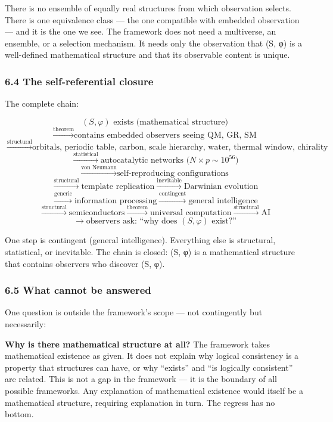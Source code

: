 \documentclass[
]{article}
\begin{document}
There is no ensemble of equally real structures from which observation
selects. There is one equivalence class --- the one compatible with
embedded observation --- and it is the one we see. The framework does
not need a multiverse, an ensemble, or a selection mechanism. It needs
only the observation that (S, φ) is a well-defined mathematical
structure and that its observable content is unique.

\hypertarget{the-self-referential-closure}{%
\subsubsection{6.4 The self-referential
closure}\label{the-self-referential-closure}}

The complete chain:

\[(S, \varphi) \text{ exists (mathematical structure)}\]
\[\xrightarrow{\text{theorem}} \text{contains embedded observers seeing QM, GR, SM}\]
\[\xrightarrow{\text{structural}} \text{orbitals, periodic table, carbon, scale hierarchy, water, thermal window, chirality}\]
\[\xrightarrow{\text{statistical}} \text{autocatalytic networks (}N \times p \sim 10^{56}\text{)}\]
\[\xrightarrow{\text{von Neumann}} \text{self-reproducing configurations}\]
\[\xrightarrow{\text{structural}} \text{template replication} \xrightarrow{\text{inevitable}} \text{Darwinian evolution}\]
\[\xrightarrow{\text{generic}} \text{information processing} \xrightarrow{\text{contingent}} \text{general intelligence}\]
\[\xrightarrow{\text{structural}} \text{semiconductors} \xrightarrow{\text{theorem}} \text{universal computation} \xrightarrow{\text{structural}} \text{AI}\]
\[\xrightarrow{} \text{observers ask: ``why does } (S, \varphi) \text{ exist?''}\]

One step is contingent (general intelligence). Everything else is
structural, statistical, or inevitable. The chain is closed: (S, φ) is a
mathematical structure that contains observers who discover (S, φ).

\hypertarget{what-cannot-be-answered}{%
\subsubsection{6.5 What cannot be
answered}\label{what-cannot-be-answered}}

One question is outside the framework's scope --- not contingently but
necessarily:

\textbf{Why is there mathematical structure at all?} The framework takes
mathematical existence as given. It does not explain why logical
consistency is a property that structures can have, or why ``exists''
and ``is logically consistent'' are related. This is not a gap in the
framework --- it is the boundary of all possible frameworks. Any
explanation of mathematical existence would itself be a mathematical
structure, requiring explanation in turn. The regress has no bottom.
\end{document}

